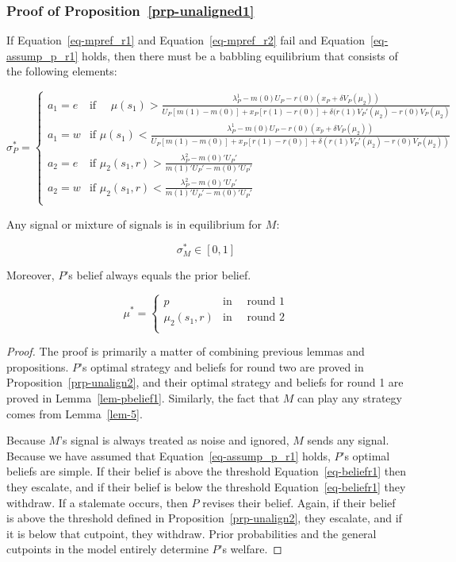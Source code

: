 \documentclass[
  12pt,
]{article}
\theoremstyle{plain}
\theoremstyle{plain}
\theoremstyle{remark}
\begin{document}
\subsubsection{\texorpdfstring{Proof of
Proposition~\ref{prp-unaligned1}}{Proof of Proposition~}}\label{proof-of-prp-unaligned1}

If Equation~\ref{eq-mpref_r1} and Equation~\ref{eq-mpref_r2} fail and
Equation~\ref{eq-assump_p_r1} holds, then there must be a babbling
equilibrium that consists of the following elements:

\[
\sigma^{*}_P = 
\begin{cases}
a_1= e  & \text{if } \quad\mu(s_1)
> \frac{\lambda^1_P - m(0)U_P - r(0)(x_P + \delta V_P(\mu_2))}
 {U_P[ m(1) - m(0) ]+ x_P [r(1) -r(0)] 
 + \delta (r(1)V_P'(\mu_2) - r(0)V_P(\mu_2)}\\
a_1 = w  & \text{if } \mu(s_1)
< \frac{\lambda^1_P - m(0)U_P - r(0)(x_p + \delta V_P(\mu_2))}
 {U_P[ m(1) - m(0) ]+ x_P [r(1) -r(0)] 
 + \delta (r(1)V_P'(\mu_2) - r(0)V_P(\mu_2))}\\
a_2 = e & \text{if } \mu_2(s_1, r) > \frac{\lambda^2_P - m(0)' U_P '}{m(1)' U_P' - m(0)' U_P'}\\
a_2 = w & \text{if } \mu_2(s_1, r) < \frac{\lambda^2_P - m(0)' U_P '}{m(1)' U_P' - m(0)' U_P'}\\
\end{cases}
\]

Any signal or mixture of signals is in equilibrium for \(M\):

\[
\sigma^{*}_M \in [0, 1]
\]

Moreover, \(P\)'s belief always equals the prior belief.

\[
\mu^*= 
\begin{cases}
p  & \text{in } \quad \text{round 1}\\
\mu_2(s_1, r)  & \text{in } \quad \text{round 2}\\
\end{cases}
\]

\begin{proof}
The proof is primarily a matter of combining previous lemmas and
propositions. \(P\)'s optimal strategy and beliefs for round two are
proved in Proposition~\ref{prp-unalign2}, and their optimal strategy and
beliefs for round 1 are proved in Lemma~\ref{lem-pbelief1}. Similarly,
the fact that \(M\) can play any strategy comes from Lemma~\ref{lem-5}.

Because \(M\)'s signal is always treated as noise and ignored, \(M\)
sends any signal. Because we have assumed that
Equation~\ref{eq-assump_p_r1} holds, \(P\)'s optimal beliefs are simple.
If their belief is above the threshold Equation~\ref{eq-beliefr1} then
they escalate, and if their belief is below the threshold
Equation~\ref{eq-beliefr1} they withdraw. If a stalemate occurs, then
\(P\) revises their belief. Again, if their belief is above the
threshold defined in Proposition~\ref{prp-unalign2}, they escalate, and
if it is below that cutpoint, they withdraw. Prior probabilities and the
general cutpoints in the model entirely determine \(P\)'s welfare.
\end{proof}
\end{document}
